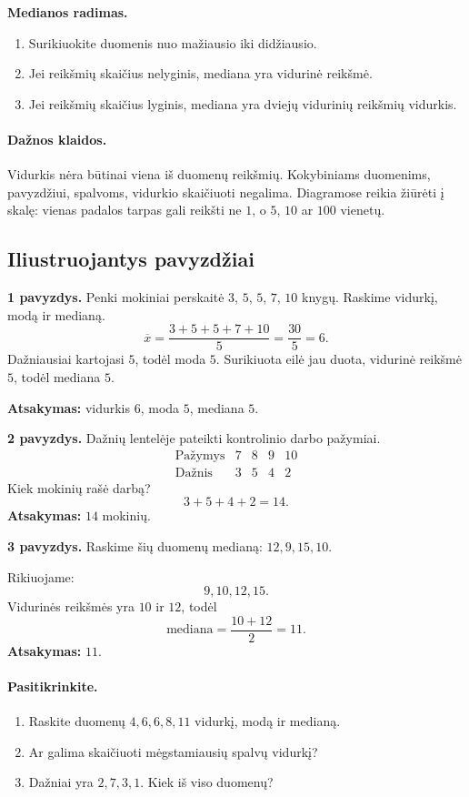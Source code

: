 \textbf{Medianos radimas.}
\begin{enumerate}[label=\arabic*.]
\item Surikiuokite duomenis nuo mažiausio iki didžiausio.
\item Jei reikšmių skaičius nelyginis, mediana yra vidurinė reikšmė.
\item Jei reikšmių skaičius lyginis, mediana yra dviejų vidurinių reikšmių vidurkis.
\end{enumerate}

\paragraph{Dažnos klaidos.}
Vidurkis nėra būtinai viena iš duomenų reikšmių. Kokybiniams duomenims, pavyzdžiui, spalvoms, vidurkio skaičiuoti negalima. Diagramose reikia žiūrėti į skalę: vienas padalos tarpas gali reikšti ne \(1\), o \(5\), \(10\) ar \(100\) vienetų.

\subsection{Iliustruojantys pavyzdžiai}
\textbf{1 pavyzdys.} Penki mokiniai perskaitė \(3\), \(5\), \(5\), \(7\), \(10\) knygų. Raskime vidurkį, modą ir medianą.
\[
\overline{x}=\frac{3+5+5+7+10}{5}=\frac{30}{5}=6.
\]
Dažniausiai kartojasi \(5\), todėl moda \(5\). Surikiuota eilė jau duota, vidurinė reikšmė \(5\), todėl mediana \(5\).

\textbf{Atsakymas:} vidurkis \(6\), moda \(5\), mediana \(5\).

\textbf{2 pavyzdys.} Dažnių lentelėje pateikti kontrolinio darbo pažymiai.
\[
\begin{array}{c|cccc}
\text{Pažymys}&7&8&9&10\\ \hline
\text{Dažnis}&3&5&4&2
\end{array}
\]
Kiek mokinių rašė darbą?
\[
3+5+4+2=14.
\]
\textbf{Atsakymas:} \(14\) mokinių.

\textbf{3 pavyzdys.} Raskime šių duomenų medianą: \(12,9,15,10\).

Rikiuojame:
\[
9,10,12,15.
\]
Vidurinės reikšmės yra \(10\) ir \(12\), todėl
\[
\text{mediana}=\frac{10+12}{2}=11.
\]
\textbf{Atsakymas:} \(11\).

\paragraph{Pasitikrinkite.}
\begin{enumerate}[label=\arabic*.]
\item Raskite duomenų \(4,6,6,8,11\) vidurkį, modą ir medianą.
\item Ar galima skaičiuoti mėgstamiausių spalvų vidurkį?
\item Dažniai yra \(2,7,3,1\). Kiek iš viso duomenų?
\end{enumerate}

